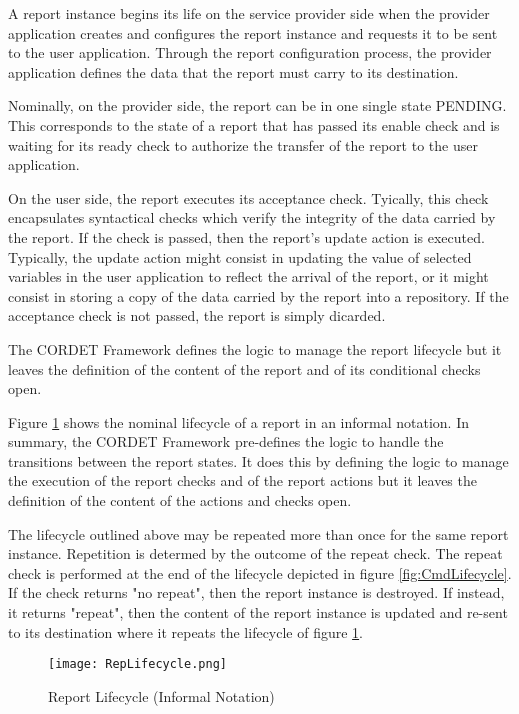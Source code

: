 A report instance begins its life on the service provider side when the provider application creates and configures the report instance and requests it to be sent to the user application. Through the report configuration process, the provider application defines the data that the report must carry to its destination.

Nominally, on the provider side, the report can be in one single state PENDING. This corresponds to the state of a report that has passed its enable check and is waiting for its ready check to authorize the transfer of the report to the user application. 

On the user side, the report executes its acceptance check. Tyically, this check encapsulates syntactical checks which verify the integrity of the data carried by the report. If the check is passed, then the report's update action is executed. Typically, the update action might consist in updating the value of selected variables in the user application to reflect the arrival of the report, or it might consist in storing a copy of the data carried by the report into a repository. If the acceptance check is not passed, the report is simply dicarded.  

The CORDET Framework defines the logic to manage the report lifecycle but it leaves the definition of the content of the report and of its conditional checks open.

Figure \ref{fig:RepLifecycle} shows the nominal lifecycle of a report in an informal notation. In summary, the CORDET Framework pre-defines the logic to handle the transitions between the report states. It does this by defining the logic to manage the execution of the report checks and of the report actions but it leaves the definition of the content of the actions and checks open. 

The lifecycle outlined above may be repeated more than once for the same report instance. Repetition is determed by the outcome of the repeat check. The repeat check is performed at the end of the lifecycle depicted in figure \ref{fig:CmdLifecycle}. If the check returns "no repeat", then the report instance is destroyed. If instead, it returns "repeat", then the content of the report instance is updated and re-sent to its destination where it repeats the lifecycle of figure \ref{fig:RepLifecycle}.

\begin{figure}[H]
 \centering
 \texttt{[image: RepLifecycle.png]}
 \caption{Report Lifecycle (Informal Notation)}
 \label{fig:RepLifecycle}
\end{figure}


